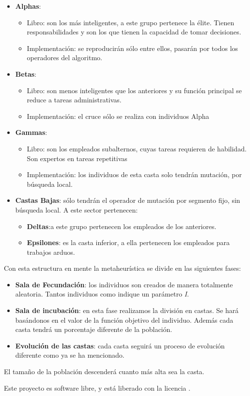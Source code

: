 \begin{itemize}
    \item \textbf{Alphas}:
        \begin{itemize}
            \item Libro: son los más inteligentes, a este grupo pertenece la élite. Tienen responsabilidades y son
            los que tienen la capacidad de tomar decisiones.
            \item Implementación: se reproducirán sólo entre ellos, pasarán por todos los operadores del algoritmo.
        \end{itemize}
    \item \textbf{Betas}: 
        \begin{itemize}
            \item Libro: son menos inteligentes que los anteriores y su función principal se reduce a tareas
            administrativas.
            \item  Implementación: el cruce sólo se realiza con individuos Alpha
        \end{itemize}
    \item \textbf{Gammas}: 
        \begin{itemize}
            \item Libro: son los empleados subalternos, cuyas tareas requieren de habilidad. Son expertos en tareas repetitivas
            \item Implementación: los individuos de esta casta solo tendrán mutación, por búsqueda local.
        \end{itemize}
    \item \textbf{Castas Bajas}: sólo tendrán el operador de mutación por segmento fijo, sin búsqueda local. A este sector pertenecen:
        \begin{itemize}
            \item \textbf{Deltas}:a este grupo pertenecen los empleados de los anteriores.
            \item \textbf{Epsilones}: es la casta inferior, a ella pertenecen los empleados para trabajos arduos.
        \end{itemize}
\end{itemize}

Con esta estructura en mente la metaheurística se divide en las siguientes fases:

\begin{itemize}
    \item \textbf{Sala de Fecundación}: los individuos son creados de manera totalmente aleatoria. Tantos individuos
    como indique un parámetro \textit{I}.
    \item \textbf{Sala de incubación}: en esta fase realizamos la división en castas. Se hará basándonos en el valor de
    la función objetivo del individuo. Además cada casta tendrá un porcentaje diferente de la población.
    \item \textbf{Evolución de las castas}: cada casta seguirá un proceso de evolución diferente como ya se 
    ha mencionado.
\end{itemize}

El tamaño de la población descenderá cuanto más alta sea la casta.


Este proyecto es software libre, y está liberado con la licencia \cite{gplv3}.